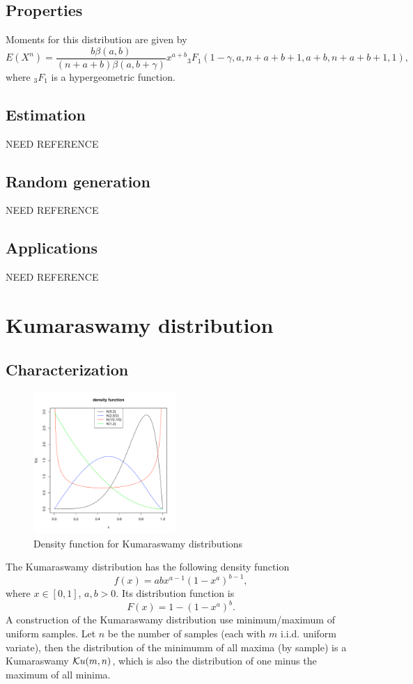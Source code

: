 \subsection{Properties}
Moments for this distribution are given by
$$
E(X^n) = \frac{b\beta(a,b)}{(n+a+b)\beta(a,b+\gamma)} x^{a+b} {}_3F_1(1-\gamma, a, n+a+b+1, a+b, n+a+b+1, 1),
$$
where ${}_3F_1$ is a hypergeometric function.


\subsection{Estimation}
NEED REFERENCE
\subsection{Random generation}
NEED REFERENCE
\subsection{Applications}
NEED REFERENCE

\section{Kumaraswamy distribution}
\subsection{Characterization}
\begin{figure}
  \vspace{-20pt}
  \begin{center}
    \includegraphics[width=0.48\textwidth]{img/kumarzoom}
  \end{center}
  \vspace{-20pt}  
  \caption{Density function for Kumaraswamy distributions}
\end{figure}
The Kumaraswamy distribution has the following density function
$$
f(x) = abx^{a-1}(1-x^a)^{b-1},
$$
where $x\in [0,1]$, $a,b>0$. Its distribution function is 
$$
F(x) = 1-(1-x^a)^b.
$$
A construction of the Kumaraswamy distribution use minimum/maximum of uniform samples. Let $n$
be the number of samples (each with $m$ i.i.d. uniform variate), then the distribution of the minimumm of all maxima (by sample) is a Kumaraswamy $\mathcal Ku(m,n)$, which is also the distribution of one minus the maximum of all minima.


